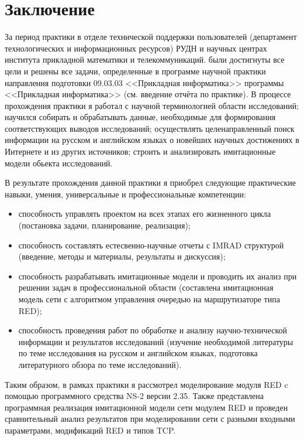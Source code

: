 \chapter*{Заключение}

За период практики в отделе технической поддержки пользователей
(департамент технологических и информационных ресурсов) РУДН и научных
центрах института прикладной математики и телекоммуникаций.  были
достигнуты все цели и решены все задачи, определенные в программе
научной практики направления подготовки 09.03.03 <<Прикладная
информатика>> программы <<Прикладная информатика>> (см. введение
отчёта по практике). В процессе прохождения практики я работал с
научной терминологией области исследований; научился собирать и
обрабатывать данные, необходимые для формирования
соответствующих выводов исследований; осуществлять целенаправленный
поиск информации на русском и английском языках о новейших научных
достижениях в Интернете и из других источников; строить и анализировать
имитационные модели обьекта исследований.

В результате прохождения данной практики я приобрел следующие
практические навыки, умения, универсальные и профессиональные
компетенции:

\begin{itemize}
\item способность управлять проектом на всех этапах его жизненного
  цикла (постановка задачи, планирование, реализация);
\item способность составлять естесвенно-научные отчеты с IMRAD
  структурой (введение, методы и материалы, результаты и дискуссия);
\item способность разрабатывать имитационные модели и проводить их
  анализ при решении задач в профессиональной области (составлена
  имитационная модель сети с алгоритмом управления очередью на 
  маршрутизаторе типа RED);
\item способность проведения работ по обработке и анализу
  научно-технической информации и результатов исследований (изучение
  необходимой литературы по теме исследования на русском и английском
  языках, подготовка литературного обзора по теме исследований).
\end{itemize}

Таким образом, в рамках практики я рассмотрел моделирование модуля RED
c помощью программного средства NS-2 версии 2.35. Также представлена
программная реализация имитационной модели сети модулем RED и проведен
сравнительный анализ результатов при моделировании сети с разными
входными параметрами, модификаций RED и типов TCP.


